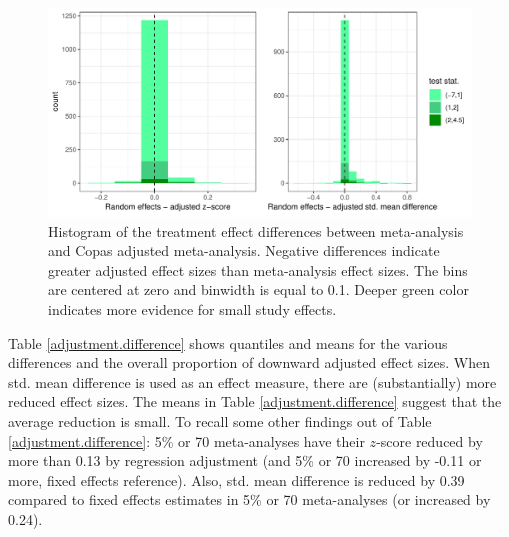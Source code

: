 \documentclass[11pt,a4paper,twoside]{book}\usepackage[]{graphicx}\usepackage[]{color}
\newenvironment{knitrout}{}{} %
\begin{document}
\begin{figure}
\begin{knitrout}
\color{fgcolor}

{\centering \includegraphics[width=\textwidth-3cm]{figure/ch03_figunnamed-chunk-22-1} 

}



\end{knitrout}
\caption{Histogram of the treatment effect differences between meta-analysis and Copas adjusted meta-analysis. Negative differences indicate greater adjusted effect sizes than meta-analysis effect sizes. The bins are centered at zero and binwidth is equal to 0.1. Deeper green color indicates more evidence for small study effects.}
\label{fig:adjustment.copas}
\end{figure}

Table \ref{adjustment.difference} shows quantiles and means for the various differences and the overall proportion of downward adjusted effect sizes. When std. mean difference is used as an effect measure, there are (substantially) more reduced effect sizes. The means in Table \ref{adjustment.difference} suggest that the average reduction is small. To recall some other findings out of Table \ref{adjustment.difference}: 5\% or 70 meta-analyses have their $z$-score reduced by more than 0.13 by regression adjustment (and 5\% or 70 increased by -0.11 or more, fixed effects reference). Also, std. mean difference is reduced by 0.39 compared to fixed effects estimates in 5\% or 70 meta-analyses (or increased by 0.24). 
\end{document}
